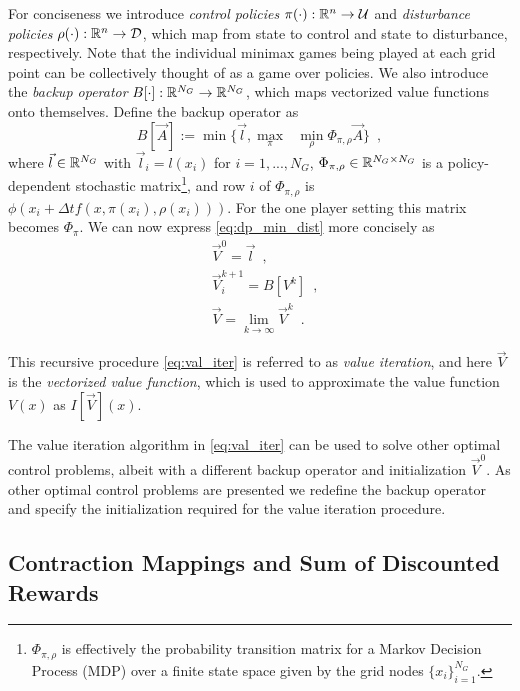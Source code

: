 For conciseness we introduce \emph{control policies} ${\pi(\cdot): \mathbb{R}^n \rightarrow \mathcal{U}}$ and \emph{disturbance policies} ${\rho(\cdot): \mathbb{R}^n \rightarrow \mathcal{D}}$, which map from state to control and state to disturbance, respectively. Note that the individual minimax games being played at each grid point can be collectively thought of as a game over policies. We also introduce the \emph{backup operator} ${B[\cdot]: \mathbb{R}^{N_G} \rightarrow \mathbb{R}^{N_G}}$, which maps vectorized value functions onto themselves. Define the backup operator as
%
\begin{equation} \label{eq: op_min_dist}
 B[\vec{A}] := \min\{\vec{l},  \underset{\pi}{\max}\text{ }\underset{ \rho}{\min} \Phi_{\pi, \rho} \vec{A}\} \enspace,
\end{equation}%
\noindent where ${\vec{l} \in \mathbb{R}^{N_G}}$ with ${\vec{l}_i = l(x_i)}$ for ${i=1, ..., N_G}$, ${\Phi_{\pi, \rho} \in \mathbb{R}^{N_G \times N_G}}$ is a policy-dependent stochastic matrix\footnote{$\Phi_{\pi, \rho}$ is effectively the probability transition matrix for a Markov Decision Process (MDP) over a finite state space given by the grid nodes ${\{x_i\}_{i=1}^{N_G}}$.}, and row $i$ of $\Phi_{\pi, \rho}$ is $\phi(x_i+\Delta tf(x, \pi(x_i), \rho(x_i)))$. For the one player setting this matrix becomes $\Phi_{\pi}$. We can now express \eqref{eq:dp_min_dist} more concisely as
%
\begin{subequations}\label{eq:val_iter}
\begin{align}
&\vec{V}^{0} = \vec{l} \enspace,\\
&\vec{V}_{i}^{k+1} = B[V^k] \enspace,\\
&\vec{V} = \lim_{k\rightarrow \infty} \vec{V}^{k} \enspace.
\end{align}
\end{subequations}

This recursive procedure \eqref{eq:val_iter} is referred to as \emph{value iteration}, and here $\vec{V}$ is the \emph{vectorized value function}, which is used to approximate the value function $V(x)$ as $I[\vec{V}](x)$. 

The value iteration algorithm in \eqref{eq:val_iter} can be used to solve other optimal control problems, albeit with a different backup operator and initialization $\vec{V}^{0}$. As other optimal control problems are presented we redefine the backup operator and specify the initialization required for the value iteration procedure.

\subsection{Contraction Mappings and Sum of Discounted Rewards}

